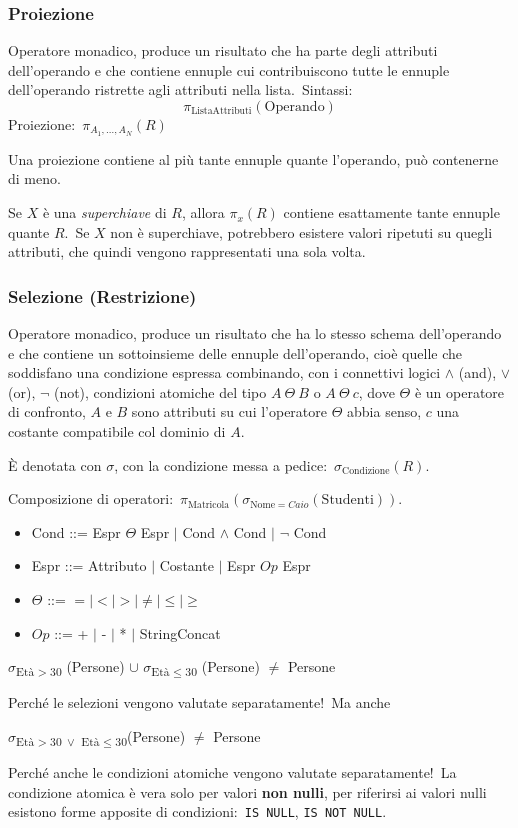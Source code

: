 \subsubsection{Proiezione}

Operatore monadico, produce un risultato che ha parte degli attributi dell'operando e che contiene ennuple cui contribuiscono tutte le ennuple dell'operando ristrette agli attributi nella lista.\
Sintassi:
\[\pi_{\mathrm{ListaAttributi}}(\mathrm{Operando})\]
Proiezione:\ $\pi_{A_1, \dots, A_N}(R)$

\noindent Una proiezione contiene al più tante ennuple quante l'operando, può contenerne di meno.

Se $X$ è una \textit{superchiave} di $R$, allora $\pi_x(R)$ contiene esattamente tante ennuple quante $R$.\
Se $X$ non è superchiave, potrebbero esistere valori ripetuti su quegli attributi, che quindi vengono rappresentati una sola volta.

\subsubsection{Selezione (Restrizione)}

Operatore monadico, produce un risultato che ha lo stesso schema dell'operando e che contiene un sottoinsieme delle ennuple dell'operando, cioè quelle che soddisfano una condizione espressa combinando, con i connettivi logici $\land$ (and), $\lor$ (or), $\lnot$ (not), condizioni atomiche del tipo $A\ \Theta\ B$ o $A\ \Theta\ c $, dove $\Theta$ è un operatore di confronto, $A$ e $B$ sono attributi su cui l'operatore $\Theta$ abbia senso, $c$ una costante compatibile col dominio di $A$.\

È denotata con $\sigma$, con la condizione messa a pedice:\ $\sigma_{\mathrm{Condizione}} (R)$.

Composizione di operatori:\ $\pi_{\mathrm{Matricola}}(\sigma_{\mathrm{Nome} = \mathit{Caio}} (\mathrm{Studenti}))$.
\begin{itemize}
	\item Cond ::= Espr $\Theta$ Espr $|$ Cond $\land$ Cond $|$ $\lnot$ Cond
	\item Espr ::= Attributo $|$ Costante $|$ Espr $Op$ Espr
	\item $\Theta$ ::= $ = | < | > | \neq | \leq | \geq $
	\item $Op$ ::= + $|$ - $|$ * $|$ StringConcat
\end{itemize}

\begin{center}
	$\sigma$\textsubscript{Età$>30$} (Persone) $\cup$ $\sigma$\textsubscript{Età$\leq 30$} (Persone) $\neq$ Persone
\end{center}
Perché le selezioni vengono valutate separatamente!\
Ma anche
\begin{center}
	$\sigma$\textsubscript{Età$>30\ \lor$ Età$\leq30$}(Persone) $\neq$ Persone
\end{center}
Perché anche le condizioni atomiche vengono valutate separatamente!\
La condizione atomica è vera solo per valori \textbf{non nulli}, per riferirsi ai valori nulli esistono forme apposite di condizioni:\ \texttt{IS NULL}, \texttt{IS NOT NULL}.

